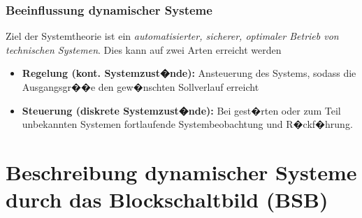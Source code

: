 \documentclass[12pt,a4paper,ngerman]{scrartcl}
\begin{document}
\subsubsection*{Beeinflussung dynamischer Systeme}
Ziel der Systemtheorie ist ein \emph{automatisierter, sicherer, optimaler Betrieb von technischen Systemen}. Dies kann auf zwei Arten erreicht werden
\begin{itemize}
\item \textbf{Regelung (kont. Systemzust�nde):} Ansteuerung des Systems, sodass die Ausgangsgr��e den gew�nschten Sollverlauf erreicht
\item \textbf{Steuerung (diskrete Systemzust�nde):} Bei gest�rten oder zum Teil unbekannten Systemen fortlaufende Systembeobachtung und R�ckf�hrung.
\end{itemize}

\section{Beschreibung dynamischer Systeme durch das Blockschaltbild (BSB)}
\end{document}
